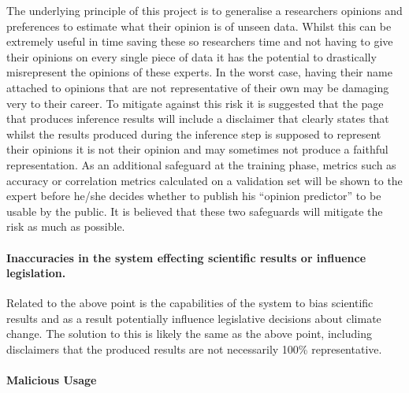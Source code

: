 \documentclass{ecmm427_assignment}
\begin{document}
The underlying principle of this project is to generalise a researchers
opinions and preferences to estimate what their opinion is of unseen
data. Whilst this can be extremely useful in time saving these so
researchers time and not having to give their opinions on every single
piece of data it has the potential to drastically misrepresent the
opinions of these experts. In the worst case, having their name attached
to opinions that are not representative of their own may be damaging
very to their career. To mitigate against this risk it is suggested
that the page that produces inference results will include a disclaimer
that clearly states that whilst the results produced during the inference
step is supposed to represent their opinions it is not their opinion
and may sometimes not produce a faithful representation. As an additional
safeguard at the training phase, metrics such as accuracy or correlation
metrics calculated on a validation set will be shown to the expert
before he/she decides whether to publish his ``opinion predictor''
to be usable by the public. It is believed that these two safeguards
will mitigate the risk as much as possible. 

\paragraph{Inaccuracies in the system effecting scientific results or influence
legislation. }

Related to the above point is the capabilities of the system to bias
scientific results and as a result potentially influence legislative
decisions about climate change. The solution to this is likely the
same as the above point, including disclaimers that the produced results
are not necessarily 100\% representative. 

\paragraph{Malicious Usage}
\end{document}

